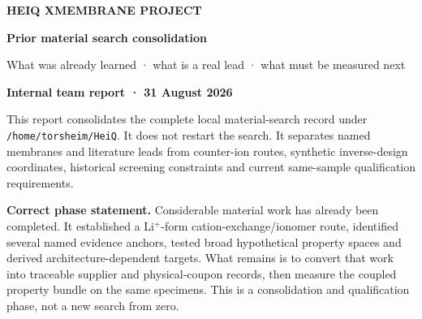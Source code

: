 \documentclass[10pt,a4paper]{article}
\begin{document}
\thispagestyle{empty}
\vspace*{-10mm}
\begin{tcolorbox}[enhanced,colback=Navy,colframe=Navy,boxrule=0pt,
  arc=0mm,left=11mm,right=11mm,top=13mm,bottom=13mm,width=\textwidth]
  {\sffamily\bfseries\color{TealLight}\large HEIQ XMEMBRANE PROJECT}\par\vspace{7mm}
  {\raggedright\sffamily\bfseries\color{white}\fontsize{28}{32}\selectfont
  Prior material search consolidation\par}
  \vspace{4mm}
  {\sffamily\color{white!85}\fontsize{14}{18}\selectfont
  What was already learned · what is a real lead · what must be measured next}
\end{tcolorbox}

\vspace{12mm}
{\sffamily\bfseries\fontsize{16}{20}\selectfont\color{Navy}Internal team report · 31 August 2026}\par
\vspace{5mm}
{\fontsize{12}{17}\selectfont\color{Ink}
This report consolidates the complete local material-search record under
\texttt{/home/torsheim/HeiQ}. It does not restart the search. It separates
named membranes and literature leads from counter-ion routes, synthetic
inverse-design coordinates, historical screening constraints and current
same-sample qualification requirements.}

\vspace{8mm}
\begin{mainbox}
\textbf{Correct phase statement.} Considerable material work has already been
completed. It established a Li$^+$-form cation-exchange/ionomer route,
identified several named evidence anchors, tested broad hypothetical property
spaces and derived architecture-dependent targets. What remains is to convert
that work into traceable supplier and physical-coupon records, then measure the
coupled property bundle on the same specimens. This is a consolidation and
qualification phase, not a new search from zero.
\end{mainbox}
\end{document}
